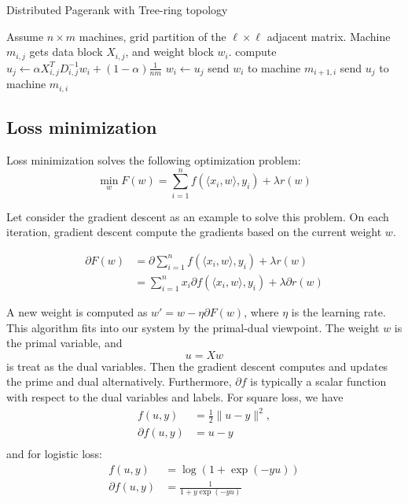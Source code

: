 \documentclass[11pt, twocolumn]{article}
\begin{document}
\begin{algorithm}[tb]
  \caption{Distributed Pagerank with Tree-ring topology}
  \label{algo:pr2}
  \begin{algorithmic}[1]
    \REQUIRE Assume $n\times m$ machines, grid partition of the $\ell \times \ell$
    adjacent matrix. Machine
    $m_{i,j}$  gets data block $X_{i,j}$, and weight block $w_i$.
    \STATE compute $u_j \gets \alpha X_{i,j}^T D_{i,j}^{-1} w_i + (1-\alpha)\frac{1}{nm}$
    \STATE $w_i \gets u_j$
    \STATE send $w_i$ to machine $m_{i+1,i}$
    \ELSE
    \STATE send $u_j$ to machine $m_{i,i}$
    \ENDIF
    \ENDFOR
    \ENDFOR
  \end{algorithmic}
\end{algorithm}

\subsection{Loss minimization}

Loss minimization solves the following optimization problem:
\begin{equation}
  \min_w F(w) = \sum_{i=1}^{n} f(\langle x_i, w\rangle, y_i) + \lambda r(w)
\end{equation}

Let consider the gradient descent as an example to solve this problem. On each
iteration, gradient descent compute the gradients based on the current weight $w$.

\begin{align*}
  \partial F(w) &= \partial \sum_{i=1}^{n}  f(\langle x_i, w\rangle, y_i) +
  \lambda r(w) \\
  &= \sum_{i=1}^{n} x_i \partial f(\langle x_i, w\rangle, y_i) +
  \lambda \partial r(w)
\end{align*}

A new weight is computed as $w' = w - \eta \partial F(w)$, where $\eta$ is the
learning rate. This algorithm fits into our system by the primal-dual
viewpoint. The weight $w$ is the primal
variable, and
\begin{equation}
  u = X w
\end{equation}
is treat as the dual variables.
Then the gradient descent computes and updates
the prime and dual alternatively. Furthermore, $\partial f$ is typically a
scalar function with respect to the dual variables and labels. For square loss,
we have
\begin{align*}
  f(u,y) & = \frac{1}{2} \|u-y\|^2, \\
  \partial f(u,y) &= u-y \\
\end{align*}
    and for logistic loss:
  \begin{align*}
f(u,y) & = \log(1+\exp(-y u))  \\
  \partial f(u,y) &= \frac{1}{1 + y\exp(-yu)}
\end{align*}
\end{document}
